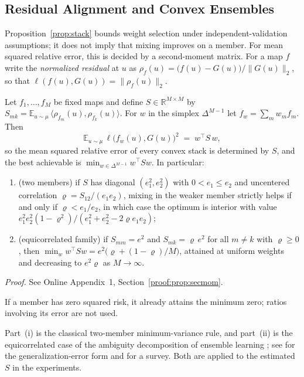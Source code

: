 \documentclass[twoside,11pt]{article}
\begin{document}
\subsection{Residual Alignment and Convex Ensembles}
\label{sec:theory-secmom}

Proposition~\ref{prop:stack} bounds weight selection under independent-validation assumptions; it does not imply that mixing improves on a member. For mean squared relative error, this is decided by a second-moment matrix. For a
map $f$ write the \emph{normalized residual} at $u$ as
$\rho_f(u)=\big(f(u)-G(u)\big)/\|G(u)\|_2$, so that
$\ell(f(u),G(u))=\|\rho_f(u)\|_2$.

\begin{proposition}\label{prop:secmom}
Let $f_1,\dots,f_M$ be fixed maps and define
$S\in\mathbb R^{M\times M}$ by
$S_{mk}=\mathbb E_{u\sim\mu}\,\langle\rho_{f_m}(u),\rho_{f_k}(u)\rangle$.
For $w$ in the simplex $\Delta^{M-1}$ let $f_w=\sum_m w_mf_m$. Then
\[
\mathbb E_{u\sim\mu}\,\ell\big(f_w(u),G(u)\big)^2\;=\;w^\top S\,w ,
\]
so the mean squared relative error of every convex stack is determined by $S$, and
the best achievable is $\min_{w\in\Delta^{M-1}}w^\top Sw$. In particular:
\begin{enumerate}
\item[(i)] (two members) if $S$ has diagonal $(e_1^2,e_2^2)$ with $0<e_1\le e_2$
and uncentered correlation $\varrho=S_{12}/(e_1e_2)$, mixing in the weaker member
strictly helps if and only if $\varrho<e_1/e_2$, in which case the optimum is
interior with value $e_1^2e_2^2(1-\varrho^2)/(e_1^2+e_2^2-2\varrho e_1e_2)$;
\item[(ii)] (equicorrelated family) if $S_{mm}=e^2$ and $S_{mk}=\varrho\,e^2$
for all $m\neq k$ with $\varrho\ge0$, then
$\min_{w}w^\top Sw=e^2\big(\varrho+(1-\varrho)/M\big)$, attained at uniform
weights and decreasing to $e^2\varrho$ as $M\to\infty$.
\end{enumerate}
\end{proposition}
\noindent\emph{Proof.} See Online Appendix~1, Section~\ref{proof:prop:secmom}.


If a member has zero squared risk, it already attains the minimum zero; ratios involving its error are not used.

Part~(i) is the classical two-member minimum-variance rule, and part~(ii) is
the equicorrelated case of the ambiguity decomposition of ensemble learning
\citep{krogh1995neural}; see \citet{ueda1996generalization} for the
generalization-error form and \citet{brown2005diversity} for a survey. Both
are applied to the estimated $S$ in the experiments.
\end{document}
